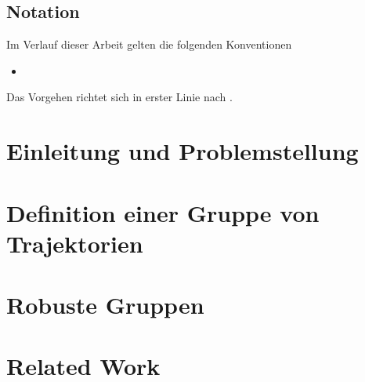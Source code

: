 




\tableofcontents

\section*{Notation}
Im Verlauf dieser Arbeit gelten die folgenden Konventionen
\begin{itemize}
	\item 
\end{itemize}
Das Vorgehen richtet sich in erster Linie nach \textcite{buchin2015}.
\cleardoubleoddemptypage
{}
\setcounter{page}{1}
\setcounter{footnote}{0}

\chapter{Einleitung und Problemstellung} %
\label{cha:einleitung}


\chapter{Definition einer Gruppe von Trajektorien} %
\label{cha:def_gruppe}



\chapter{Robuste Gruppen} %
\label{cha:robust}

\chapter{Related Work} %
\label{cha:related_work}







\cleardoubleoddemptypage
{}
\setcounter{page}{1}
\appendix
\printindex
\listoffigures
\printbibliography
\todototoc
{}
